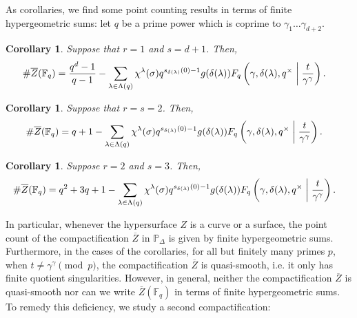 \documentclass[11pt, reqno]{amsart}
\theoremstyle{plain}
\newtheorem{corol}[theo]{Corollary}
\theoremstyle{definition}
\newcommand{\Ps}{\mathbb{P}}
\newcommand{\F}{\mathbb{F}}
\newcommand{\ga}{\gamma}
\begin{document}
As corollaries, we find some point counting results in terms of finite hypergeometric sums: 
let $q$ be a prime power which is coprime to $\ga_1\dots \ga_{d+2}$.
\begin{corol}\label{theo:intro-corol-1}
Suppose that $r=1$ and $s={d+1}$. Then,
  \begin{align*}
      \#\overline{Z}(\F_q)&= \frac{q^{d}-1}{q-1}-\sum_{\lambda \in \Lambda(q)} \chi^{\lambda}(\sigma) q^{s_{\delta(\lambda)}(0)-1} g(\delta(\lambda))  F_q\left(\gamma,\delta(\lambda), q^\times \biggm\vert \frac{t}{\gamma^\gamma}\right).
  \end{align*}
\end{corol}
\begin{corol}\label{theo:intro-corol-2}
Suppose that $r=s=2$. Then,
\begin{align*}
      \#\overline{Z}(\F_q)&= q+1 -\sum_{\lambda \in \Lambda(q)} \chi^{\lambda}(\sigma) q^{s_{\delta(\lambda)}(0)-1} g(\delta(\lambda))  F_q\left(\gamma,\delta(\lambda), q^\times\biggm\vert \frac{t}{\gamma^\gamma}\right).
  \end{align*}
\end{corol}
\begin{corol}\label{theo:intro-corol-3}
Suppose $r=2$ and $s=3$. Then,
\begin{align*}
      \#\overline{Z}(\F_q)&= q^2+3q +1  -\sum_{\lambda \in \Lambda(q)} \chi^{\lambda}(\sigma) q^{s_{\delta(\lambda)}(0)-1} g(\delta(\lambda))  F_q\left(\gamma,\delta(\lambda), q^\times \biggm\vert \frac{t}{\gamma^\gamma}\right).
  \end{align*}
\end{corol}
In particular, whenever the hypersurface $Z$ is a curve or a surface, the point count of the compactification $\overline{Z}$ in $\Ps_{\Delta}$ is given by finite hypergeometric sums.  Furthermore, in the cases of the corollaries, for all but finitely many primes $p$, when $ t \neq \ga^{\ga} \pmod{p}$, the compactification $\overline{Z}$ is quasi-smooth, i.e. it only has finite quotient singularities. However, in general, neither the compactification $\overline{Z}$ is quasi-smooth nor can we write $\overline{Z}(\F_q)$ in terms of finite hypergeometric sums. To remedy this deficiency, we study a second compactification:
\end{document}
